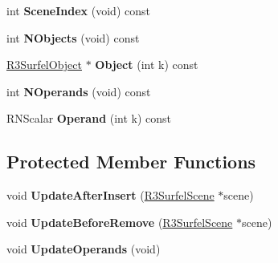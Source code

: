 \begin{DoxyCompactItemize}
\item 
int {\bfseries Scene\+Index} (void) const \hypertarget{class_r3_surfel_object_relationship_ac32b9b20ce06d599338f8050851d1440}{}\label{class_r3_surfel_object_relationship_ac32b9b20ce06d599338f8050851d1440}

\item 
int {\bfseries N\+Objects} (void) const \hypertarget{class_r3_surfel_object_relationship_a1899ffeb4f7b5e186a6fd43f7e3a31ea}{}\label{class_r3_surfel_object_relationship_a1899ffeb4f7b5e186a6fd43f7e3a31ea}

\item 
\hyperlink{class_r3_surfel_object}{R3\+Surfel\+Object} $\ast$ {\bfseries Object} (int k) const \hypertarget{class_r3_surfel_object_relationship_a326d6326f1037e09d18d50249e7e9100}{}\label{class_r3_surfel_object_relationship_a326d6326f1037e09d18d50249e7e9100}

\item 
int {\bfseries N\+Operands} (void) const \hypertarget{class_r3_surfel_object_relationship_a5c1f055f753716f8f957858a252255d8}{}\label{class_r3_surfel_object_relationship_a5c1f055f753716f8f957858a252255d8}

\item 
R\+N\+Scalar {\bfseries Operand} (int k) const \hypertarget{class_r3_surfel_object_relationship_ab8142b3111ac93789e53f3d0e8d40505}{}\label{class_r3_surfel_object_relationship_ab8142b3111ac93789e53f3d0e8d40505}

\end{DoxyCompactItemize}
\subsection*{Protected Member Functions}
\begin{DoxyCompactItemize}
\item 
void {\bfseries Update\+After\+Insert} (\hyperlink{class_r3_surfel_scene}{R3\+Surfel\+Scene} $\ast$scene)\hypertarget{class_r3_surfel_object_relationship_aef71af4fa261b1b266e31ab9c76a3341}{}\label{class_r3_surfel_object_relationship_aef71af4fa261b1b266e31ab9c76a3341}

\item 
void {\bfseries Update\+Before\+Remove} (\hyperlink{class_r3_surfel_scene}{R3\+Surfel\+Scene} $\ast$scene)\hypertarget{class_r3_surfel_object_relationship_af6eb8493d15e530c0ac28d1ecf403c47}{}\label{class_r3_surfel_object_relationship_af6eb8493d15e530c0ac28d1ecf403c47}

\item 
void {\bfseries Update\+Operands} (void)\hypertarget{class_r3_surfel_object_relationship_a233214557373574497546c48dd48dbd0}{}\label{class_r3_surfel_object_relationship_a233214557373574497546c48dd48dbd0}

\end{DoxyCompactItemize}
